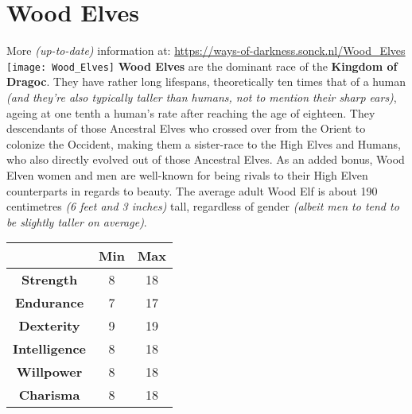 \documentclass[openany,10pt,a4paper]{book}
\begin{document}
\section{Wood Elves}
More \textit{(up-to-date)} information at: \url{https://ways-of-darkness.sonck.nl/Wood_Elves}\newline
\texttt{[image: Wood\_Elves]}\newline
\textbf{Wood Elves} are the dominant race of the \textbf{Kingdom of Dragoc}. They have rather long lifespans, theoretically ten times that of a human \textit{(and they're also typically taller than humans, not to mention their sharp ears)}, ageing at one tenth a human's rate after reaching the age of eighteen. They descendants of those Ancestral Elves who crossed over from the Orient to colonize the Occident, making them a sister-race to the High Elves and Humans, who also directly evolved out of those Ancestral Elves. As an added bonus, Wood Elven women and men are well-known for being rivals to their High Elven counterparts in regards to beauty. The average adult Wood Elf is about 190 centimetres \textit{(6 feet and 3 inches)} tall, regardless of gender \textit{(albeit men to tend to be slightly taller on average)}.\newline
\begin{tabular}{|c|c|c|}
\hline
 & \textbf{Min} & \textbf{Max} \\ \hline
\textbf{Strength} & 8 & 18 \\ \hline
\textbf{Endurance} & 7 & 17 \\ \hline
\textbf{Dexterity} & 9 & 19 \\ \hline
\textbf{Intelligence} & 8 & 18 \\ \hline
\textbf{Willpower} & 8 & 18 \\ \hline
\textbf{Charisma} & 8 & 18 \\ \hline
\end{tabular}\newline
{} \newpage
\end{document}
